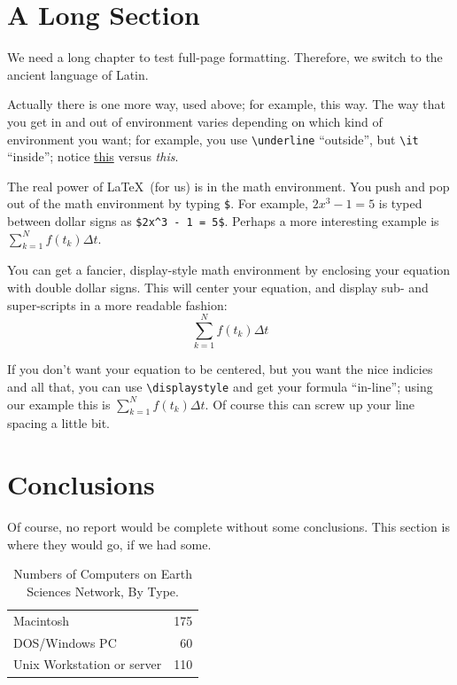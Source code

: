 \documentclass[12pt,a4paper]{mvgl}
\begin{document}
\begin{mvglReport}
\section{A Long Section}
\label{sec:long}
We need a long chapter to test full-page formatting. Therefore, we
switch to the ancient language of Latin.

\noindent Actually there is one more way, used above; for example, 
{\sc this way}.  The way that you get in and out of environment varies
depending on which kind of environment you want; for example, you use 
\verb|\underline| ``outside'', but \verb|\it| ``inside''; 
notice \underline{this} versus {\it this}.

The real power of \LaTeX\ (for us) is in the math environment. You 
push and pop out of the math environment by typing \verb|$|. For 
example, $2x^3 - 1 = 5$ is typed between dollar signs as
\verb|$2x^3 - 1 = 5$|. Perhaps a more interesting example is $ \sum_{k=1}^N f(t_k) \Delta t. $

You can get a fancier, display-style math 
environment by enclosing your equation with double dollar signs.  
This will center your equation, and display sub- and super-scripts in 
a more readable fashion: $$ \sum_{k=1}^N f(t_k) \Delta t $$

If you don't want your equation to be centered, but you want the nice 
indicies and all that, you can use \verb|\displaystyle| and get your 
formula ``in-line''; using our example this is 
$ \displaystyle \sum_{k=1}^N f(t_k) \Delta t $.  Of 
course this can screw up your line spacing a little bit.

\section{Conclusions}
\label{conc}
Of course, no report would be complete without some conclusions.
This section is where they would go, if we had some.

\begin{table}[htb] 
\centering
\caption{Numbers of Computers on Earth Sciences Network, By Type.}
\begin{tabular}{lr}
	Macintosh                  & 175 \\
	DOS/Windows PC             &  60 \\
	Unix Workstation or server & 110
\end{tabular}
\end{table}

\nocite{*}

\normalfont 




\end{mvglReport}
\end{document}
